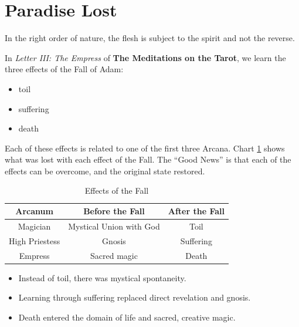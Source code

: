 \section{Paradise Lost}

\begin{quotex}
In the right order of nature, the flesh is subject to the spirit and not the reverse.
\end{quotex}


In \emph{Letter III: The Empress} of \textbf{The Meditations on the Tarot}, we learn the three effects of the Fall of Adam:

\begin{itemize}


\item toil

\item suffering

\item death
\end{itemize}


Each of these effects is related to one of the first three Arcana. Chart \ref{tab:EffectsFall} shows what was lost with each effect of the Fall. The ``Good News'' is that each of the effects can be overcome, and the original state restored.

\begin{table}[h]\small\centering
\begin{tabular}{ccc}\toprule
\textbf{Arcanum} & \textbf{Before the Fall} & \textbf{After the Fall} \\\midrule
Magician & Mystical Union with God & Toil \\
High Priestess & Gnosis & Suffering \\
Empress & Sacred magic & Death \\\bottomrule
\end{tabular}
\label{tab:EffectsFall}
\caption{Effects of the Fall}
\end{table}

\begin{itemize}


\item Instead of toil, there was mystical spontaneity.

\item Learning through suffering replaced direct revelation and gnosis.

\item Death entered the domain of life and sacred, creative magic.
\end{itemize}

